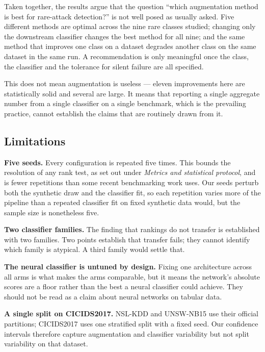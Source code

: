 \documentclass[11pt]{article}
\begin{document}
Taken together, the results argue that the question ``which augmentation method is
best for rare-attack detection?'' is not well posed as usually asked. Five different
methods are optimal across the nine rare classes studied; changing only the
downstream classifier changes the best method for all nine; and the same method that
improves one class on a dataset degrades another class on the same dataset in the
same run. A recommendation is only meaningful once the class, the classifier and the
tolerance for silent failure are all specified.

This does not mean augmentation is useless --- eleven improvements here are
statistically solid and several are large. It means that reporting a single
aggregate number from a single classifier on a single benchmark, which is the
prevailing practice, cannot establish the claims that are routinely drawn from it.

\subsection*{Limitations}

\noindent\textbf{Five seeds.} Every configuration is repeated five times. This bounds the
resolution of any rank test, as set out under \emph{Metrics and statistical protocol}, and is fewer repetitions than some recent benchmarking work uses. Our seeds perturb both the
synthetic draw and the classifier fit, so each repetition varies more of the
pipeline than a repeated classifier fit on fixed synthetic data would, but the
sample size is nonetheless five.

\noindent\textbf{Two classifier families.} The finding that rankings do not transfer is
established with two families. Two points establish that transfer fails; they cannot
identify which family is atypical. A third family would settle that.

\noindent\textbf{The neural classifier is untuned by design.} Fixing one architecture across
all arms is what makes the arms comparable, but it means the network's absolute
scores are a floor rather than the best a neural classifier could achieve. They
should not be read as a claim about neural networks on tabular data.

\noindent\textbf{A single split on CICIDS2017.} NSL-KDD and UNSW-NB15 use their official
partitions; CICIDS2017 uses one stratified split with a fixed seed. Our confidence
intervals therefore capture augmentation and classifier variability but not
split variability on that dataset.
\end{document}
